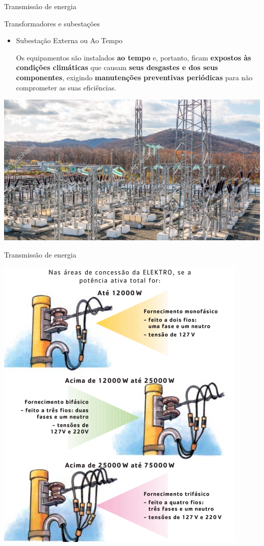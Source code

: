 \begin{frame}{Transmissão de energia}
	\begin{block}{Transformadores e subestações}
		\begin{itemize}
			\item Subestação Externa ou Ao Tempo

			      Os equipamentos são instalados \textbf{ao tempo} e, portanto, ficam \textbf{expostos às condições climáticas} que causam \textbf{seus desgastes e dos seus componentes}, exigindo \textbf{manutenções preventivas periódicas} para não comprometer as suas eficiências.
		\end{itemize}
	\end{block}

	\centering
	\includegraphics[width=0.7\linewidth]{Figuras/Ch03/fig16}
\end{frame}


\begin{frame}{Transmissão de energia}

	\centering
	\includegraphics[height=0.9\textheight]{Figuras/Ch03/fig18}
\end{frame}


